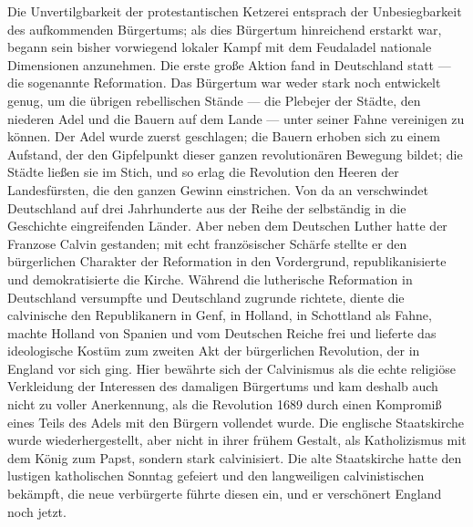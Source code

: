 Die Unvertilgbarkeit der protestantischen Ketzerei entsprach der
Unbesiegbarkeit des aufkommenden Bürgertums; als dies Bürgertum
hinreichend erstarkt war, begann sein bisher vorwiegend lokaler Kampf
mit dem Feudaladel nationale Dimensionen anzunehmen. Die erste große
Aktion fand in Deutschland statt --- die sogenannte Reformation. Das
Bürgertum war weder stark noch entwickelt genug, um die übrigen
rebellischen Stände --- die Plebejer der Städte, den niederen Adel und die
Bauern auf dem Lande --- unter seiner Fahne vereinigen zu können. Der Adel
wurde zuerst geschlagen; die Bauern erhoben sich zu einem Aufstand, der
den Gipfelpunkt dieser ganzen revolutionären Bewegung bildet; die Städte
ließen sie im Stich, und so erlag die Revolution den Heeren der
Landesfürsten, die den ganzen Gewinn einstrichen. Von da an verschwindet
Deutschland auf drei Jahrhunderte aus der Reihe der selbständig in die
Geschichte eingreifenden Länder. Aber neben dem Deutschen Luther hatte
der Franzose Calvin gestanden; mit echt französischer Schärfe stellte er
den bürgerlichen Charakter der Reformation in den Vordergrund,
republikanisierte und
demokratisierte die Kirche.
Während die lutherische Reformation in Deutschland versumpfte und
Deutschland zugrunde richtete, diente die calvinische den Republikanern
in Genf, in Holland, in Schottland als Fahne, machte Holland von Spanien
und vom Deutschen Reiche frei und lieferte das ideologische Kostüm zum
zweiten Akt der bürgerlichen Revolution, der in England vor sich ging.
Hier bewährte sich der Calvinismus als die echte religiöse Verkleidung
der Interessen des damaligen Bürgertums und kam deshalb auch nicht zu
voller Anerkennung, als die Revolution 1689 durch einen Kompromiß eines
Teils des Adels mit den Bürgern vollendet wurde. Die englische
Staatskirche wurde wiederhergestellt, aber nicht in ihrer frühem
Gestalt, als Katholizismus mit dem König zum Papst, sondern stark
calvinisiert. Die alte Staatskirche hatte den lustigen katholischen
Sonntag gefeiert und den langweiligen calvinistischen bekämpft, die neue
verbürgerte führte diesen ein, und er verschönert England noch jetzt.

